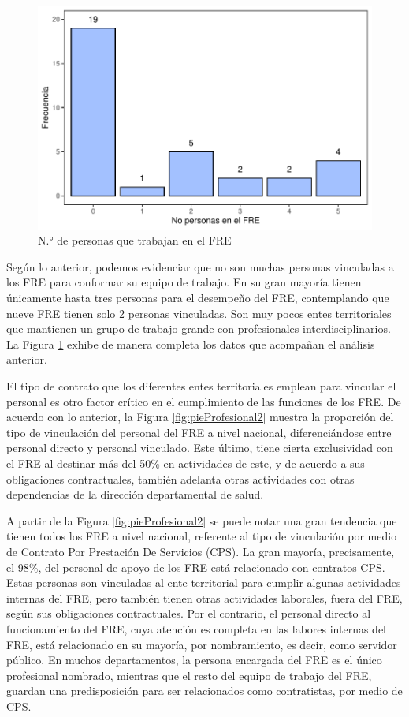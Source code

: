 \documentclass[
]{book}
\begin{document}
\begin{figure}
\includegraphics[width=1\linewidth]{InformeFinal_files/figure-latex/perfilProfesional3-1} \caption{N.° de personas que trabajan en el FRE}\label{fig:perfilProfesional3}
\end{figure}

Según lo anterior, podemos evidenciar que no son muchas personas vinculadas a los FRE para conformar su equipo de trabajo. En su gran mayoría tienen únicamente hasta tres personas para el desempeño del FRE, contemplando que nueve FRE tienen solo 2 personas vinculadas. Son muy pocos entes territoriales que mantienen un grupo de trabajo grande con profesionales interdisciplinarios. La Figura \ref{fig:perfilProfesional3} exhibe de manera completa los datos que acompañan el análisis anterior.

El tipo de contrato que los diferentes entes territoriales emplean para vincular el personal es otro factor crítico en el cumplimiento de las funciones de los FRE. De acuerdo con lo anterior, la Figura \ref{fig:pieProfesional2} muestra la proporción del tipo de vinculación del personal del FRE a nivel nacional, diferenciándose entre personal directo y personal vinculado. Este último, tiene cierta exclusividad con el FRE al destinar más del 50\% en actividades de este, y de acuerdo a sus obligaciones contractuales, también adelanta otras actividades con otras dependencias de la dirección departamental de salud.

A partir de la Figura \ref{fig:pieProfesional2} se puede notar una gran tendencia que tienen todos los FRE a nivel nacional, referente al tipo de vinculación por medio de Contrato Por Prestación De Servicios (CPS). La gran mayoría, precisamente, el 98\%, del personal de apoyo de los FRE está relacionado con contratos CPS. Estas personas son vinculadas al ente territorial para cumplir algunas actividades internas del FRE, pero también tienen otras actividades laborales, fuera del FRE, según sus obligaciones contractuales. Por el contrario, el personal directo al funcionamiento del FRE, cuya atención es completa en las labores internas del FRE, está relacionado en su mayoría, por nombramiento, es decir, como servidor público. En muchos departamentos, la persona encargada del FRE es el único profesional nombrado, mientras que el resto del equipo de trabajo del FRE, guardan una predisposición para ser relacionados como contratistas, por medio de CPS.
\end{document}
